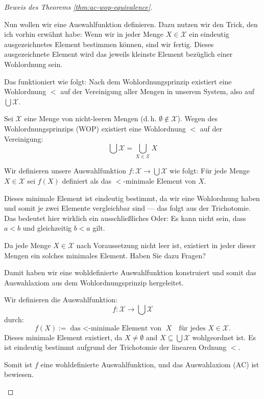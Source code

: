 \begin{proof}[Beweis des Theorems \ref{thm:ac-wop-equivalence}]
\begin{spoken-clean}[00:36:58 - 00:38:08]
Nun wollen wir eine Auswahlfunktion definieren. Dazu nutzen wir den Trick, den ich vorhin erwähnt habe: Wenn wir in jeder Menge $X \in \mathcal{X}$ ein eindeutig ausgezeichnetes Element bestimmen können, sind wir fertig. Dieses ausgezeichnete Element wird das jeweils kleinste Element bezüglich einer Wohlordnung sein.

Das funktioniert wie folgt: Nach dem Wohlordnungsprinzip existiert eine Wohlordnung $<$ auf der Vereinigung aller Mengen in unserem System, also auf $\bigcup \mathcal{X}$.
\end{spoken-clean}

\begin{math-stroke}
Sei $\mathcal{X}$ eine Menge von nicht-leeren Mengen (d.\,h. $\emptyset \notin \mathcal{X}$).
Wegen des Wohlordnungsprinzips (WOP) existiert eine Wohlordnung $<$ auf der Vereinigung:
\[
\bigcup \mathcal{X} = \bigcup_{X \in \mathcal{X}} X
\]
\end{math-stroke}

\begin{spoken-clean}[00:38:08 - 00:39:33]
Wir definieren unsere Auswahlfunktion $f \colon \mathcal{X} \to \bigcup \mathcal{X}$ wie folgt: Für jede Menge $X \in \mathcal{X}$ sei $f(X)$ definiert als das $<$-minimale Element von $X$.

Dieses minimale Element ist eindeutig bestimmt, da wir eine Wohlordnung haben und somit je zwei Elemente vergleichbar sind --- das folgt aus der Trichotomie. Das  bedeutet hier wirklich ein ausschließliches Oder: Es kann nicht sein, dass $a < b$ und gleichzeitig $b < a$ gilt.

Da jede Menge $X \in \mathcal{X}$ nach Voraussetzung nicht leer ist, existiert in jeder dieser Mengen ein solches minimales Element. Haben Sie dazu Fragen?

Damit haben wir eine wohldefinierte Auswahlfunktion konstruiert und somit das Auswahlaxiom aus dem Wohlordnungsprinzip hergeleitet.
\end{spoken-clean}

\begin{math-stroke}
Wir definieren die Auswahlfunktion:
\[
f \colon \mathcal{X} \to \bigcup \mathcal{X}
\]
durch:
\[
f(X) := \text{das $<$-minimale Element von } X \quad \text{für jedes } X \in \mathcal{X}.
\]
Dieses minimale Element existiert, da $X \neq \emptyset$ and $X \subseteq \bigcup \mathcal{X}$ wohlgeordnet ist. Es ist eindeutig bestimmt aufgrund der Trichotomie der linearen Ordnung $<$.

Somit ist $f$ eine wohldefinierte Auswahlfunktion, und das Auswahlaxiom ($\text{AC}$) ist bewiesen.
\end{math-stroke}
\end{proof}

